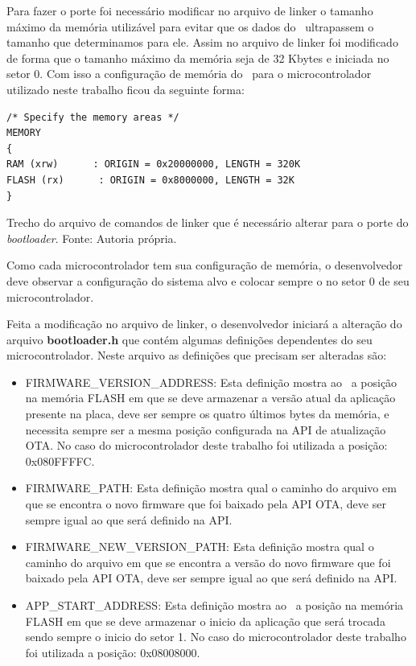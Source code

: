 Para fazer o porte foi necessário modificar no arquivo de linker o tamanho máximo da memória utilizável para evitar que os dados do \bootloader\ ultrapassem o tamanho que determinamos para ele. Assim no arquivo de linker foi modificado de forma que o tamanho máximo da memória seja de 32 Kbytes e iniciada no setor 0. Com isso a configuração de memória do \bootloader\ para o microcontrolador utilizado neste trabalho ficou da seguinte forma:


\begin{algorithm}[H]
\begin{lstlisting}
/* Specify the memory areas */
MEMORY
{
RAM (xrw)      : ORIGIN = 0x20000000, LENGTH = 320K
FLASH (rx)      : ORIGIN = 0x8000000, LENGTH = 32K
}

\end{lstlisting}
\caption{Trecho do arquivo de comandos de linker que é necessário alterar para o porte do \textit{bootloader}.
\newline Fonte: Autoria própria.}
\end{algorithm}

Como cada microcontrolador tem sua configuração de memória, o desenvolvedor deve observar a configuração do sistema alvo e colocar sempre o \bootloader no setor 0 de seu microcontrolador.

Feita a modificação no arquivo de linker, o desenvolvedor iniciará a alteração do arquivo \textbf{bootloader.h} que contém algumas definições dependentes do seu microcontrolador. Neste arquivo as definições que precisam ser alteradas são:
\begin{itemize}
    \item FIRMWARE\_VERSION\_ADDRESS: Esta definição mostra ao \bootloader\ a posição na memória FLASH em que se deve armazenar a versão atual da aplicação presente na placa, deve ser sempre os quatro últimos bytes da memória, e necessita sempre ser a mesma posição configurada na API de atualização OTA. No caso do microcontrolador deste trabalho foi utilizada a posição: 0x080FFFFC.
    \item FIRMWARE\_PATH: Esta definição mostra qual o caminho do arquivo em que se encontra o novo firmware que foi baixado pela API OTA, deve ser sempre igual ao que será definido na API.
    \item FIRMWARE\_NEW\_VERSION\_PATH: Esta definição mostra qual o caminho do arquivo em que se encontra a versão do novo firmware que foi baixado pela API OTA, deve ser sempre igual ao que será definido na API.
    \item APP\_START\_ADDRESS: Esta definição mostra ao \bootloader\ a posição na memória FLASH em que se deve armazenar o inicio da aplicação que será trocada sendo sempre o inicio do setor 1. No caso do microcontrolador deste trabalho foi utilizada a posição: 0x08008000.
   
\end{itemize}

